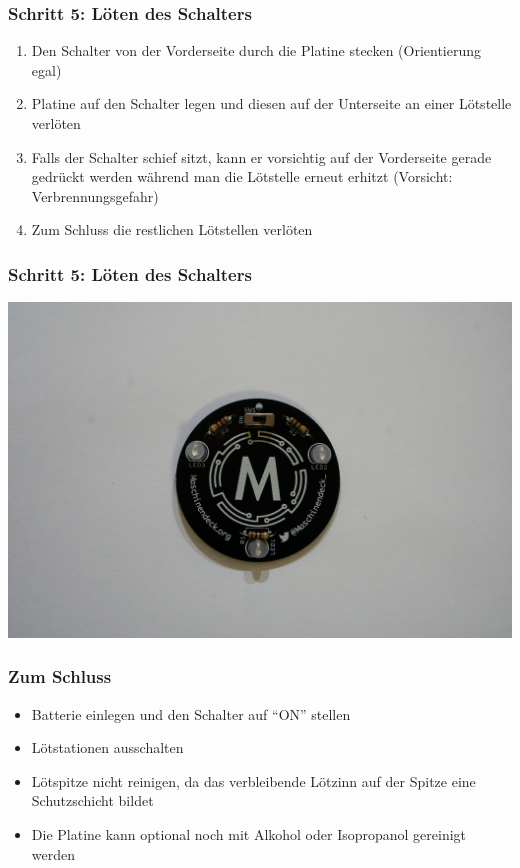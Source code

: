 \documentclass[10pt]{beamer}
\begin{document}
	\begin{frame}
	\frametitle{Schritt 5: Löten des Schalters}
	\begin{enumerate} 
		\item{Den Schalter von der Vorderseite durch die Platine stecken (Orientierung egal)}
		\item{Platine auf den Schalter legen und diesen auf der Unterseite an einer Lötstelle verlöten}
		\item{Falls der Schalter schief sitzt, kann er vorsichtig auf der Vorderseite gerade gedrückt werden während man die Lötstelle erneut erhitzt (Vorsicht: Verbrennungsgefahr)}
		\item{Zum Schluss die restlichen Lötstellen verlöten}
	\end{enumerate}
	\end{frame}

	\begin{frame}
		\frametitle{Schritt 5: Löten des Schalters}
		\includegraphics[width=\linewidth]{images/badge18/final.JPG}
	\end{frame}

	\begin{frame}
	\frametitle{Zum Schluss}
	\begin{itemize} 
		\item{Batterie einlegen und den Schalter auf ``ON'' stellen}
		\item{Lötstationen ausschalten}
		\item{Lötspitze nicht reinigen, da das verbleibende Lötzinn auf der Spitze eine Schutzschicht bildet}
		\item{Die Platine kann optional noch mit Alkohol oder Isopropanol gereinigt werden}
	\end{itemize}
	\end{frame}
\end{document}
